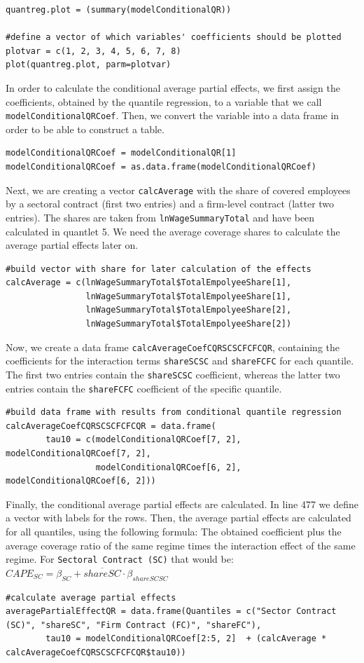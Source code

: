 \lstset{firstnumber = 453}
\begin{lstlisting}
quantreg.plot = (summary(modelConditionalQR))

#define a vector of which variables' coefficients should be plotted
plotvar = c(1, 2, 3, 4, 5, 6, 7, 8)
plot(quantreg.plot, parm=plotvar)
\end{lstlisting}
In order to calculate the conditional average partial effects, we first assign the coefficients, obtained by the quantile regression, to a variable that we call \texttt{modelConditionalQRCoef}. Then, we convert the variable into a data frame in order to be able to construct a table.
\lstset{firstnumber = 459}
\begin{lstlisting}
modelConditionalQRCoef = modelConditionalQR[1]
modelConditionalQRCoef = as.data.frame(modelConditionalQRCoef)
\end{lstlisting}
Next, we are creating a vector \texttt{calcAverage} with the share of covered employees by a sectoral contract (first two entries) and a firm-level contract (latter two entries). The shares are taken from \texttt{lnWageSummaryTotal} and have been calculated in quantlet 5. We need the average coverage shares to calculate the average partial effects later on.
\lstset{firstnumber = 462}
\begin{lstlisting}
#build vector with share for later calculation of the effects
calcAverage = c(lnWageSummaryTotal$TotalEmpolyeeShare[1],
                lnWageSummaryTotal$TotalEmpolyeeShare[1],
                lnWageSummaryTotal$TotalEmpolyeeShare[2],
                lnWageSummaryTotal$TotalEmpolyeeShare[2])
\end{lstlisting}
Now, we create a data frame \texttt{calcAverageCoefCQRSCSCFCFCQR}, containing the coefficients for the interaction terms \texttt{shareSCSC} and \texttt{shareFCFC} for each quantile. The first two entries contain the \texttt{shareSCSC} coefficient, whereas the latter two entries contain the \texttt{shareFCFC} coefficient of the specific quantile.
\lstset{firstnumber = 468}
\begin{lstlisting}
#build data frame with results from conditional quantile regression
calcAverageCoefCQRSCSCFCFCQR = data.frame(
        tau10 = c(modelConditionalQRCoef[7, 2],  modelConditionalQRCoef[7, 2],
                  modelConditionalQRCoef[6, 2],  modelConditionalQRCoef[6, 2]))
\end{lstlisting}
Finally, the conditional average partial effects are calculated. In line 477 we define a vector with labels for the rows. Then, the average partial effects are calculated for all quantiles, using the following formula: The obtained coefficient plus the average coverage ratio of the same regime times the interaction effect of the same regime. For \texttt{Sectoral Contract (SC)} that would be: $CAPE_{SC}=\beta_{SC}+\overline{shareSC}\cdot\beta_{shareSCSC}$
\lstset{firstnumber = 476}
\begin{lstlisting}
#calculate average partial effects
averagePartialEffectQR = data.frame(Quantiles = c("Sector Contract (SC)", "shareSC", "Firm Contract (FC)", "shareFC"),
        tau10 = modelConditionalQRCoef[2:5, 2]  + (calcAverage * calcAverageCoefCQRSCSCFCFCQR$tau10))
\end{lstlisting}

